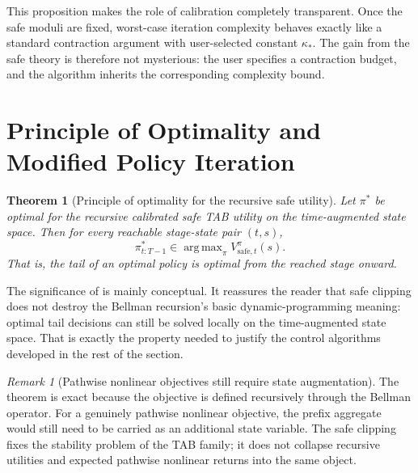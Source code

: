 \documentclass{article}
\newtheorem{theorem}{Theorem}[section]
\theoremstyle{remark}
\newtheorem{remark}[remark]{Remark}
\DeclareMathOperator*{\argmax}{arg\,max}
\newcommand{\safe}{\mathrm{safe}}
\begin{document}
This proposition makes the role of calibration completely transparent.
Once the safe moduli are fixed, worst-case iteration complexity behaves exactly like a standard contraction argument with user-selected constant $\kappa_*$.
The gain from the safe theory is therefore not mysterious: the user specifies a contraction budget, and the algorithm inherits the corresponding complexity bound.


\section{Principle of Optimality and Modified Policy Iteration}
\label{sec:principle-of-optimality}

\begin{theorem}[Principle of optimality for the recursive safe utility]
\label{thm:principle-optimality}
Let $\pi^*$ be optimal for the recursive calibrated safe TAB utility on the time-augmented state space.
Then for every reachable stage-state pair $(t,s)$,
\begin{equation}
\pi^*_{t:T-1}\in \argmax_{\pi}V_{\safe,t}^{\pi}(s).
\label{eq:safe-principle-optimality}
\end{equation}
That is, the tail of an optimal policy is optimal from the reached stage onward.
\end{theorem}

The significance of  is mainly conceptual.
It reassures the reader that safe clipping does not destroy the Bellman recursion's basic dynamic-programming meaning: optimal tail decisions can still be solved locally on the time-augmented state space.
That is exactly the property needed to justify the control algorithms developed in the rest of the section.


\begin{remark}[Pathwise nonlinear objectives still require state augmentation]
\label{rem:pathwise-augmentation}
The theorem is exact because the objective is defined recursively through the Bellman operator.
For a genuinely pathwise nonlinear objective, the prefix aggregate would still need to be carried as an additional state variable.
The safe clipping fixes the stability problem of the TAB family; it does not collapse recursive utilities and expected pathwise nonlinear returns into the same object.
\end{remark}
\end{document}
